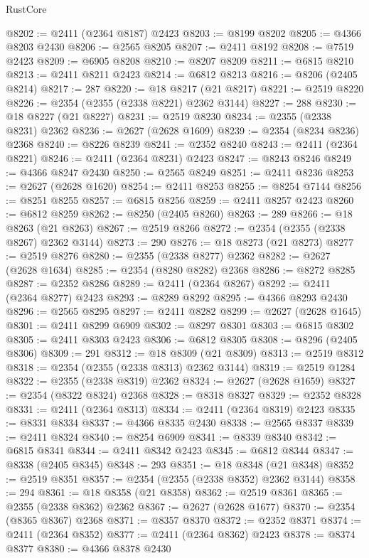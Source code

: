 \begin{lexlean}{RustCore}
\begin{coremodule}
@8202 := @2411 (@2364 @8187) @2423
@8203 := @8199 @8202
@8205 := @4366 @8203 @2430
@8206 := @2565 @8205
@8207 := @2411 @8192
@8208 := @7519 @2423
@8209 := @6905 @8208
@8210 := @8207 @8209
@8211 := @6815 @8210
@8213 := @2411 @8211 @2423
@8214 := @6812 @8213
@8216 := @8206 (@2405 @8214)
@8217 := 287
@8220 := @18 @8217 (@21 @8217)
@8221 := @2519 @8220
@8226 := @2354 (@2355 (@2338 @8221) @2362 @3144)
@8227 := 288
@8230 := @18 @8227 (@21 @8227)
@8231 := @2519 @8230
@8234 := @2355 (@2338 @8231) @2362
@8236 := @2627 (@2628 @1609)
@8239 := @2354 (@8234 @8236) @2368
@8240 := @8226 @8239
@8241 := @2352 @8240
@8243 := @2411 (@2364 @8221)
@8246 := @2411 (@2364 @8231) @2423
@8247 := @8243 @8246
@8249 := @4366 @8247 @2430
@8250 := @2565 @8249
@8251 := @2411 @8236
@8253 := @2627 (@2628 @1620)
@8254 := @2411 @8253
@8255 := @8254 @7144
@8256 := @8251 @8255
@8257 := @6815 @8256
@8259 := @2411 @8257 @2423
@8260 := @6812 @8259
@8262 := @8250 (@2405 @8260)
@8263 := 289
@8266 := @18 @8263 (@21 @8263)
@8267 := @2519 @8266
@8272 := @2354 (@2355 (@2338 @8267) @2362 @3144)
@8273 := 290
@8276 := @18 @8273 (@21 @8273)
@8277 := @2519 @8276
@8280 := @2355 (@2338 @8277) @2362
@8282 := @2627 (@2628 @1634)
@8285 := @2354 (@8280 @8282) @2368
@8286 := @8272 @8285
@8287 := @2352 @8286
@8289 := @2411 (@2364 @8267)
@8292 := @2411 (@2364 @8277) @2423
@8293 := @8289 @8292
@8295 := @4366 @8293 @2430
@8296 := @2565 @8295
@8297 := @2411 @8282
@8299 := @2627 (@2628 @1645)
@8301 := @2411 @8299 @6909
@8302 := @8297 @8301
@8303 := @6815 @8302
@8305 := @2411 @8303 @2423
@8306 := @6812 @8305
@8308 := @8296 (@2405 @8306)
@8309 := 291
@8312 := @18 @8309 (@21 @8309)
@8313 := @2519 @8312
@8318 := @2354 (@2355 (@2338 @8313) @2362 @3144)
@8319 := @2519 @1284
@8322 := @2355 (@2338 @8319) @2362
@8324 := @2627 (@2628 @1659)
@8327 := @2354 (@8322 @8324) @2368
@8328 := @8318 @8327
@8329 := @2352 @8328
@8331 := @2411 (@2364 @8313)
@8334 := @2411 (@2364 @8319) @2423
@8335 := @8331 @8334
@8337 := @4366 @8335 @2430
@8338 := @2565 @8337
@8339 := @2411 @8324
@8340 := @8254 @6909
@8341 := @8339 @8340
@8342 := @6815 @8341
@8344 := @2411 @8342 @2423
@8345 := @6812 @8344
@8347 := @8338 (@2405 @8345)
@8348 := 293
@8351 := @18 @8348 (@21 @8348)
@8352 := @2519 @8351
@8357 := @2354 (@2355 (@2338 @8352) @2362 @3144)
@8358 := 294
@8361 := @18 @8358 (@21 @8358)
@8362 := @2519 @8361
@8365 := @2355 (@2338 @8362) @2362
@8367 := @2627 (@2628 @1677)
@8370 := @2354 (@8365 @8367) @2368
@8371 := @8357 @8370
@8372 := @2352 @8371
@8374 := @2411 (@2364 @8352)
@8377 := @2411 (@2364 @8362) @2423
@8378 := @8374 @8377
@8380 := @4366 @8378 @2430

\end{coremodule}
\end{lexlean}
